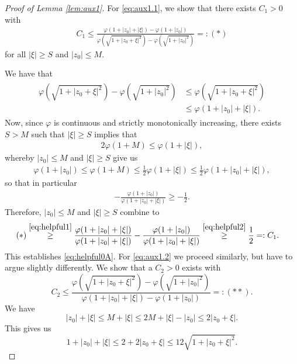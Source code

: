 \documentclass[10pt,a4paper]{amsart}
\begin{document}
	\begin{proof}[Proof of Lemma \ref{lem:aux1}] 
		For \eqref{eq:aux1.1}, we show that there exists $C_1>0$ with 
		\begin{align}\label{eq:helpful0A}
			C_1 \leq \frac{\varphi(1+|z_0|+|\xi|) - \varphi(1+|z_0|)}{\varphi(\sqrt{1+|z_0+\xi|^2}) - \varphi(\sqrt{1+|z_0|^2})} =: (*)
		\end{align}
		for all $|\xi|\geq S$ and $|z_{0}|\leq M$. 
		
		We have that 
		\begin{align}\label{eq:helpful1}
			\begin{split}
				\varphi(\sqrt{1+|z_{0}+\xi|^{2}})-\varphi(\sqrt{1+|z_{0}|^{2}}) & \leq \varphi(\sqrt{1+|z_{0}+\xi|^{2}}) \\ & \leq \varphi(1+|z_{0}|+|\xi|). 
			\end{split}
		\end{align}
		Now, since $\varphi$ is continuous and strictly monotonically increasing, there exists $S>M$ such that $|\xi|\geq S$ implies that 
		\begin{align*}
			2\varphi(1+M)\leq \varphi(1+|\xi|), 
		\end{align*}
		whereby $|z_{0}|\leq M$ and $|\xi|\geq S$ give us 
		\begin{align*}
			\varphi(1+|z_{0}|) \leq \varphi(1+M) \leq \frac{1}{2}\varphi(1+|\xi|)\leq \frac{1}{2}\varphi(1+|z_{0}|+|\xi|),
		\end{align*}
		so that in particular
		\begin{align}\label{eq:helpful2}
			-\frac{\varphi(1+|z_{0}|)}{\varphi(1+|z_{0}|+|\xi|)}\geq -\frac{1}{2}. 
		\end{align}
		Therefore, $|z_{0}|\leq M$ and $|\xi|\geq S$ combine to 
		\begin{align*}
			(*) & \stackrel{\eqref{eq:helpful1}}{\geq}  \frac{\varphi(1+|z_0|+|\xi|)}{\varphi(1+|z_{0}|+|\xi|)} - \frac{\varphi(1+|z_{0}|)}{\varphi(1+|z_{0}|+|\xi|)} \stackrel{\eqref{eq:helpful2}}{\geq} \frac{1}{2} =: C_1.
		\end{align*}
		This establishes \eqref{eq:helpful0A}.
		For \eqref{eq:aux1.2} we proceed similarly, but have to argue slightly differently. We show that a $C_2 > 0$ exists with \[
		C_2 \leq  \frac{\varphi(\sqrt{1+|z_0+\xi|^2}) - \varphi(\sqrt{1+|z_0|^2})}{\varphi(1+|z_0|+|\xi|) - \varphi(1+|z_0|)} =: (**).
		\]
		We have \[
		|z_0| + |\xi| \leq M + |\xi| \leq 2M + |\xi| - |z_0| \leq 2|z_0 + \xi|.
		\]
		This gives us \[
		1 + |z_0| + |\xi| \leq 2 + 2|z_0 + \xi| \leq 12\sqrt{1+|z_0+\xi|^2}.
\]
\end{proof}
\end{document}

